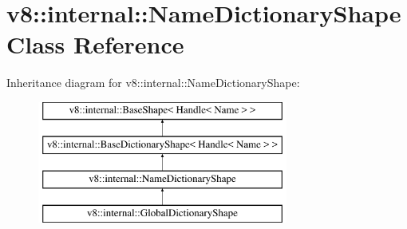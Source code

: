 \hypertarget{classv8_1_1internal_1_1NameDictionaryShape}{}\section{v8\+:\+:internal\+:\+:Name\+Dictionary\+Shape Class Reference}
\label{classv8_1_1internal_1_1NameDictionaryShape}
Inheritance diagram for v8\+:\+:internal\+:\+:Name\+Dictionary\+Shape\+:\begin{figure}[H]
\begin{center}
\leavevmode
\includegraphics[height=4.000000cm]{classv8_1_1internal_1_1NameDictionaryShape}
\end{center}
\end{figure}
